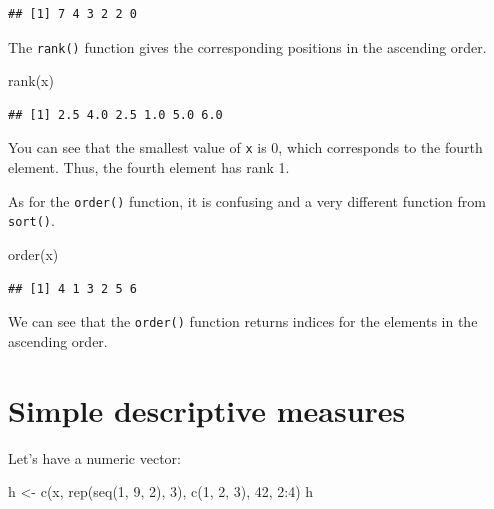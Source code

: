 \documentclass[
]{book}
\newenvironment{Shaded}{\begin{snugshade}}{\end{snugshade}}
\newcommand{\DecValTok}[1]{\textcolor[rgb]{0.00,0.00,0.81}{#1}}
\newcommand{\FunctionTok}[1]{\textcolor[rgb]{0.00,0.00,0.00}{#1}}
\newcommand{\NormalTok}[1]{#1}
\newcommand{\OtherTok}[1]{\textcolor[rgb]{0.56,0.35,0.01}{#1}}
\newcommand{\SpecialCharTok}[1]{\textcolor[rgb]{0.00,0.00,0.00}{#1}}
\theoremstyle{definition}
\theoremstyle{definition}
\theoremstyle{definition}
\theoremstyle{definition}
\theoremstyle{remark}
\begin{document}
\begin{verbatim}
## [1] 7 4 3 2 2 0
\end{verbatim}

The \texttt{rank()} function gives the corresponding positions in the ascending order.

\begin{Shaded}
\begin{Highlighting}[]
\FunctionTok{rank}\NormalTok{(x)}
\end{Highlighting}
\end{Shaded}

\begin{verbatim}
## [1] 2.5 4.0 2.5 1.0 5.0 6.0
\end{verbatim}

You can see that the smallest value of \texttt{x} is 0, which corresponds to the fourth element. Thus, the fourth element has rank 1.

As for the \texttt{order()} function, it is confusing and a very different function from \texttt{sort()}.

\begin{Shaded}
\begin{Highlighting}[]
\FunctionTok{order}\NormalTok{(x)}
\end{Highlighting}
\end{Shaded}

\begin{verbatim}
## [1] 4 1 3 2 5 6
\end{verbatim}

We can see that the \texttt{order()} function returns indices for the elements in the ascending order.

\hypertarget{simple-descriptive-measures}{%
\section{Simple descriptive measures}\label{simple-descriptive-measures}}

Let's have a numeric vector:

\begin{Shaded}
\begin{Highlighting}[]
\NormalTok{h }\OtherTok{\textless{}{-}} \FunctionTok{c}\NormalTok{(x, }\FunctionTok{rep}\NormalTok{(}\FunctionTok{seq}\NormalTok{(}\DecValTok{1}\NormalTok{, }\DecValTok{9}\NormalTok{, }\DecValTok{2}\NormalTok{), }\DecValTok{3}\NormalTok{), }\FunctionTok{c}\NormalTok{(}\DecValTok{1}\NormalTok{, }\DecValTok{2}\NormalTok{, }\DecValTok{3}\NormalTok{), }\DecValTok{42}\NormalTok{, }\DecValTok{2}\SpecialCharTok{:}\DecValTok{4}\NormalTok{)}
\NormalTok{h}
\end{Highlighting}
\end{Shaded}
\end{document}
